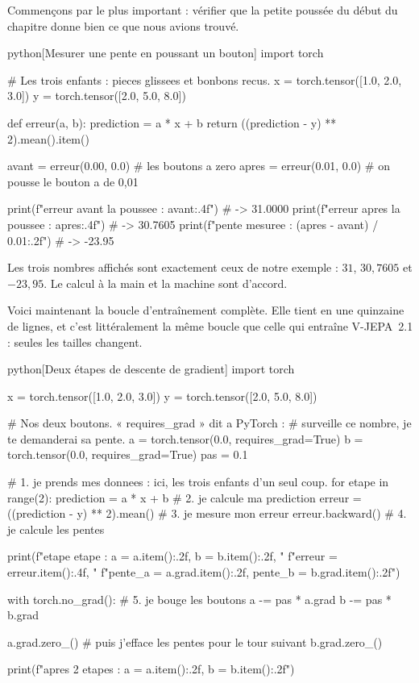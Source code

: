 Commençons par le plus important : vérifier que la petite poussée du début
du chapitre donne bien ce que nous avions trouvé.

\begin{code}{python}[Mesurer une pente en poussant un bouton]
import torch

# Les trois enfants : pieces glissees et bonbons recus.
x = torch.tensor([1.0, 2.0, 3.0])
y = torch.tensor([2.0, 5.0, 8.0])

def erreur(a, b):
    prediction = a * x + b
    return ((prediction - y) ** 2).mean().item()

avant = erreur(0.00, 0.0)   # les boutons a zero
apres = erreur(0.01, 0.0)   # on pousse le bouton a de 0,01

print(f"erreur avant la poussee : {avant:.4f}")   # -> 31.0000
print(f"erreur apres la poussee : {apres:.4f}")   # -> 30.7605
print(f"pente mesuree           : {(apres - avant) / 0.01:.2f}")  # -> -23.95
\end{code}

Les trois nombres affichés sont exactement ceux de notre exemple :
$31$, $30{,}7605$ et $-23{,}95$. Le calcul à la main et la machine sont
d'accord.

Voici maintenant la boucle d'entraînement complète. Elle tient en une
quinzaine de lignes, et c'est littéralement la même boucle que celle qui
entraîne V-JEPA~2.1 : seules les tailles changent.

\begin{code}{python}[Deux étapes de descente de gradient]
import torch

x = torch.tensor([1.0, 2.0, 3.0])
y = torch.tensor([2.0, 5.0, 8.0])

# Nos deux boutons. « requires_grad » dit a PyTorch :
# surveille ce nombre, je te demanderai sa pente.
a = torch.tensor(0.0, requires_grad=True)
b = torch.tensor(0.0, requires_grad=True)
pas = 0.1

# 1. je prends mes donnees : ici, les trois enfants d'un seul coup.
for etape in range(2):
    prediction = a * x + b                       # 2. je calcule ma prediction
    erreur = ((prediction - y) ** 2).mean()      # 3. je mesure mon erreur
    erreur.backward()                            # 4. je calcule les pentes

    print(f"etape {etape} : a = {a.item():.2f}, b = {b.item():.2f}, "
          f"erreur = {erreur.item():.4f}, "
          f"pente_a = {a.grad.item():.2f}, pente_b = {b.grad.item():.2f}")

    with torch.no_grad():                        # 5. je bouge les boutons
        a -= pas * a.grad
        b -= pas * b.grad

    a.grad.zero_()          # puis j'efface les pentes pour le tour suivant
    b.grad.zero_()

print(f"apres 2 etapes : a = {a.item():.2f}, b = {b.item():.2f}")
\end{code}

